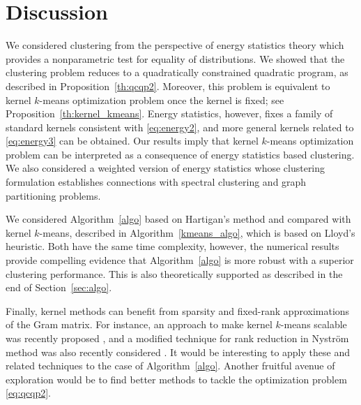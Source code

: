 \documentclass[aps,preprint,nofootinbib,floatfix]{revtex4-1}
\begin{document}
\section{Discussion}
\label{sec:conclusion}

We considered clustering from the perspective of energy
statistics theory which provides a nonparametric test for 
equality of distributions.
We showed that the clustering problem reduces to a quadratically
constrained quadratic program, 
as described in Proposition~\ref{th:qcqp2}.
Moreover, this problem is equivalent
to kernel $k$-means optimization problem once the kernel is fixed; see
Proposition~\ref{th:kernel_kmeans}. Energy statistics, however, fixes
a family of standard kernels consistent with \eqref{eq:energy2}, and
more general kernels related to \eqref{eq:energy3} can be obtained.
Our results imply that kernel $k$-means optimization problem
can be interpreted as a consequence of energy statistics based clustering.
We also considered a weighted version of energy statistics whose 
clustering formulation establishes connections with spectral
clustering and graph partitioning problems.

We considered Algorithm~\ref{algo} based on Hartigan's method and
compared with 
kernel $k$-means, described in Algorithm~\ref{kmeans_algo}, which
is based on Lloyd's heuristic.
Both have the same time complexity, however, the numerical 
results provide compelling evidence that Algorithm~\ref{algo} 
is more robust with
a superior clustering performance. This is also theoretically
supported as described in the end of Section~\ref{sec:algo}.

Finally, kernel methods can benefit from sparsity and
fixed-rank approximations of the Gram matrix.
For instance, an approach to make kernel $k$-means scalable
was recently proposed \cite{Mahoney}, and a modified technique for
rank reduction in Nystr\"om method was also recently considered 
\cite{Becker}. It would be interesting to apply these and related
techniques to the case of Algorithm~\ref{algo}.
Another fruitful avenue of exploration would be to find 
better methods to tackle the optimization problem \eqref{eq:qcqp2}.

\end{document}
